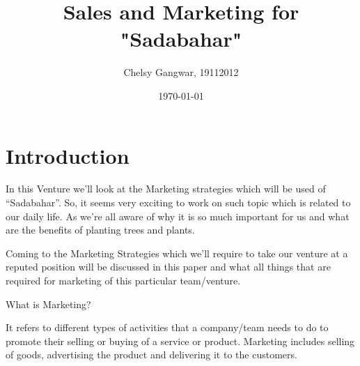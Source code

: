 \documentclass{article}
\title{\textbf{Sales and Marketing for "Sadabahar"}}
\author{Chelsy Gangwar, 19112012}
\date{\today}
\begin{document}
\maketitle

\section{Introduction}

\setlength{\parskip}{1em}

\large In this Venture we’ll look at the Marketing strategies which will be used of “Sadabahar”. So, it seems very exciting to work on such topic which is related to our daily life. As we’re all aware of why it is so much important for us and what are the benefits of planting trees and plants. 
\setlength{\parskip}{1em}

\large Coming to the Marketing Strategies which we’ll require to take our venture at a reputed position will be discussed in this paper and what all things that are required for marketing of this particular team/venture.

\setlength{\parskip}{1em}

\large What is Marketing?

\large It refers to different types of activities that a company/team needs to do to promote their selling or buying of a service or product. Marketing includes selling of goods, advertising the product and delivering it to the customers.

\setlength{\parskip}{1em}
\end{document}
